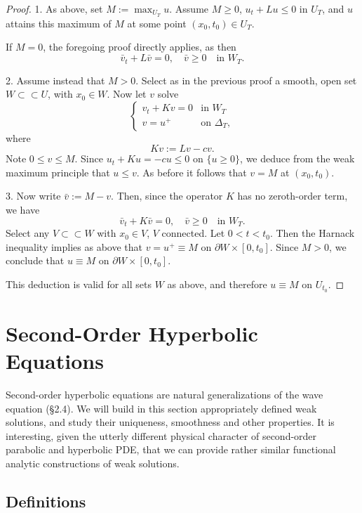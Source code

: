 \begin{proof}
1. As above, set $M := \max_{U_T} u$. Assume $M \geq 0$, $u_t + Lu \leq 0$ in $U_T$, and $u$ attains this maximum of $M$ at some point $(x_0, t_0) \in U_T$.

If $M = 0$, the foregoing proof directly applies, as then
\[
\bar{v}_t + L\bar{v} = 0, \quad \bar{v} \geq 0 \quad \text{in } W_T.
\]

2. Assume instead that $M > 0$. Select as in the previous proof a smooth, open set $W \subset\subset U$, with $x_0 \in W$. Now let $v$ solve
\[
\begin{cases}
v_t + Kv = 0 & \text{in } W_T \\
v = u^+ & \text{on } \Delta_T,
\end{cases}
\]
where
\[
Kv := Lv - cv.
\]
Note $0 \leq v \leq M$. Since $u_t + Ku = -cu \leq 0$ on $\{u \geq 0\}$, we deduce from the weak maximum principle that $u \leq v$. As before it follows that $v = M$ at $(x_0, t_0)$.

3. Now write $\bar{v} := M - v$. Then, since the operator $K$ has no zeroth-order term, we have
\[
\bar{v}_t + K\bar{v} = 0, \quad \bar{v} \geq 0 \quad \text{in } W_T.
\]
Select any $V \subset\subset W$ with $x_0 \in V$, $V$ connected. Let $0 < t < t_0$. Then the Harnack inequality implies as above that $v = u^+ \equiv M$ on $\partial W \times [0, t_0]$. Since $M > 0$, we conclude that $u \equiv M$ on $\partial W \times [0, t_0]$.

This deduction is valid for all sets $W$ as above, and therefore $u \equiv M$ on $U_{t_0}$.
\end{proof}

\section{Second-Order Hyperbolic Equations}
\label{sec:second-order-hyperbolic-equations}

Second-order hyperbolic equations are natural generalizations of the wave equation (\S2.4). We will build in this section appropriately defined weak solutions, and study their uniqueness, smoothness and other properties. It is interesting, given the utterly different physical character of second-order parabolic and hyperbolic PDE, that we can provide rather similar functional analytic constructions of weak solutions.

\subsection{Definitions}


